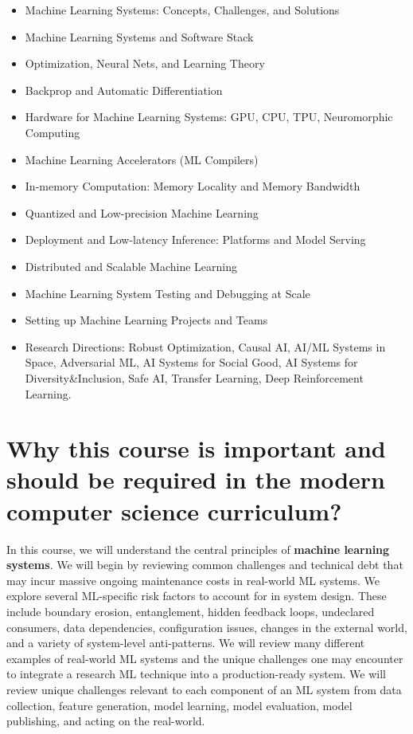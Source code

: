 \documentclass[11pt]{article}
\begin{document}
\begin{itemize}
\item Machine Learning Systems: Concepts, Challenges, and Solutions
\item Machine Learning Systems and Software Stack
\item Optimization, Neural Nets, and Learning Theory
\item Backprop and Automatic Differentiation
\item Hardware for Machine Learning Systems: GPU, CPU, TPU, Neuromorphic Computing
\item Machine Learning Accelerators (ML Compilers)
\item In-memory Computation: Memory Locality and Memory Bandwidth
\item Quantized and Low-precision Machine Learning
\item Deployment and Low-latency Inference: Platforms and Model Serving
\item Distributed and Scalable Machine Learning
\item Machine Learning System Testing and Debugging at Scale
\item Setting up Machine Learning Projects and Teams
\item Research Directions: Robust Optimization, Causal AI, AI/ML Systems in Space, Adversarial ML, AI Systems for Social Good, AI Systems for Diversity\&Inclusion, Safe AI, Transfer Learning, Deep Reinforcement Learning.
\end{itemize}




\section*{Why this course is important and should be required in the modern computer science curriculum?}

In this course, we will understand the central principles of \textbf{machine learning systems}. We will begin by reviewing common challenges and technical debt that may incur massive ongoing maintenance costs in real-world ML systems. We explore several ML-specific risk factors to account for in system design. These include boundary erosion, entanglement, hidden feedback loops, undeclared consumers, data dependencies, configuration issues, changes in the external world, and a variety of system-level anti-patterns. We will review many different examples of real-world ML systems and the unique challenges one may encounter to integrate a research ML technique into a production-ready system. We will review unique challenges relevant to each component of an ML system from data collection, feature generation, model learning, model evaluation, model publishing, and acting on the real-world. 
\end{document}
